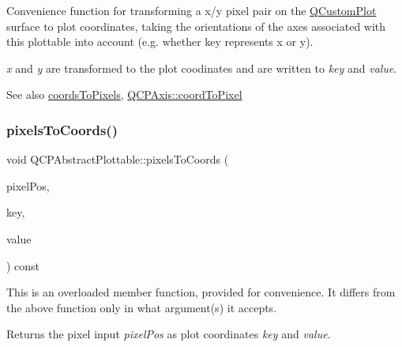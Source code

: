 Convenience function for transforming a x/y pixel pair on the \mbox{\hyperlink{class_q_custom_plot}{Q\+Custom\+Plot}} surface to plot coordinates, taking the orientations of the axes associated with this plottable into account (e.\+g. whether key represents x or y).

{\itshape x} and {\itshape y} are transformed to the plot coodinates and are written to {\itshape key} and {\itshape value}.

\begin{DoxySeeAlso}{See also}
\mbox{\hyperlink{class_q_c_p_abstract_plottable_a7ad84a36472441cf1f555c5683d0da93}{coords\+To\+Pixels}}, \mbox{\hyperlink{class_q_c_p_axis_af15d1b3a7f7e9b53d759d3ccff1fe4b4}{Q\+C\+P\+Axis\+::coord\+To\+Pixel}} 
\end{DoxySeeAlso}
\mbox{\label{class_q_c_p_abstract_plottable_a28d32c0062b9450847851ffdee1c5f69}} 
\subsubsection{\texorpdfstring{pixels\+To\+Coords()}{pixelsToCoords()}\hspace{0.1cm}{\footnotesize\ttfamily [2/2]}}
{\footnotesize\ttfamily void Q\+C\+P\+Abstract\+Plottable\+::pixels\+To\+Coords (\begin{DoxyParamCaption}\item[{const Q\+PointF \&}]{pixel\+Pos,  }\item[{double \&}]{key,  }\item[{double \&}]{value }\end{DoxyParamCaption}) const}

This is an overloaded member function, provided for convenience. It differs from the above function only in what argument(s) it accepts.

Returns the pixel input {\itshape pixel\+Pos} as plot coordinates {\itshape key} and {\itshape value}. \mbox{\label{class_q_c_p_abstract_plottable_a3cc235007e2343a65ad4f463767e0e20}} 
